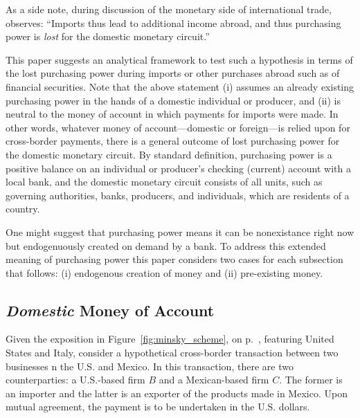 As a side note, during discussion of the monetary side of international trade, \cite{ehnts2024} observes: ``Imports thus lead to additional income abroad, and thus purchasing power is \textit{lost} for the domestic monetary circuit.''~\citep[p.~68, emhasis added]{ehnts2024} 

This paper suggests an analytical framework to test such a hypothesis in terms of the lost purchasing power during imports or other purchases abroad such as of financial securities. Note that the above statement (i) assumes an already existing purchasing power in the hands of a domestic individual or producer, and (ii) is neutral to the money of account in which payments for imports were made. In other words, whatever money of account---domestic or foreign---is relied upon for cross-border payments, there is a general outcome of lost purchasing power for the domestic monetary circuit. By standard definition, purchasing power is a positive balance on an individual or producer's checking (current) account with a local bank, and the domestic monetary circuit consists of all units, such as governing authorities, banks, producers, and individuals, which are residents of a country. 

One might suggest that purchasing power means it can be nonexistance right now but endogenuously created on demand by a bank. To address this extended meaning of purchasing power this paper considers two cases for each subsection that follows: (i) endogenous creation of money and (ii) pre-existing money.

\subsection{\textit{Domestic} Money of Account}\label{sec:xpay_dom}

Given the exposition in Figure~\ref{fig:minsky_scheme}, on p.~\pageref{fig:minsky_scheme}, featuring United States and Italy, consider a hypothetical cross-border transaction between two businesses n the U.S. and Mexico. In this transaction, there are two counterparties: a U.S.-based firm $B$ and a Mexican-based firm $C$. The former is an importer and the latter is an exporter of the products made in Mexico. Upon mutual agreement, the payment is to be undertaken in the U.S. dollars. 

